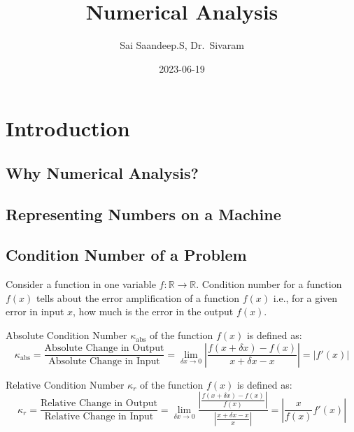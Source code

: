 \documentclass[
]{book}
\title{Numerical Analysis}
\author{Sai Saandeep.S, Dr.~Sivaram}
\date{2023-06-19}
\begin{document}
\maketitle

{
\setcounter{tocdepth}{1}
\tableofcontents
}
\hypertarget{introduction}{%
\chapter{Introduction}\label{introduction}}

\hypertarget{why-numerical-analysis}{%
\section{Why Numerical Analysis?}\label{why-numerical-analysis}}

\hypertarget{representing-numbers-on-a-machine}{%
\section{Representing Numbers on a Machine}\label{representing-numbers-on-a-machine}}

\hypertarget{condition-number-of-a-problem}{%
\section{Condition Number of a Problem}\label{condition-number-of-a-problem}}

Consider a function in one variable \(f:\mathbb{R}\to\mathbb{R}\).
Condition number for a function \(f(x)\) tells about the error amplification of a function \(f(x)\) i.e., for a given error in input \(x\), how much is the error in the output \(f(x)\).

Absolute Condition Number \(\kappa_{\text{abs}}\) of the function \(f(x)\) is defined as:
\begin{equation}
\kappa_{\text{abs}} = \frac{\text{Absolute Change in Output}}{\text{Absolute Change in Input}} = \lim_{\delta x \to 0} \left\lvert{\frac{f(x+\delta x)-f(x)}{x+\delta x - x}}\right\rvert = \left\lvert{f'(x)}\right\rvert
\end{equation}

Relative Condition Number \(\kappa_{r}\) of the function \(f(x)\) is defined as:
\begin{equation}
\kappa_{r} = \frac{\text{Relative Change in Output}}{\text{Relative Change in Input}} = \lim_{\delta x \to 0} \frac{\left\lvert{\frac{f(x+\delta x)-f(x)}{f(x)}}\right\rvert}{\left\lvert{\frac{x+\delta x - x}{x}}\right\rvert} = \left\lvert{\frac{x}{f(x)}f'(x)}\right\rvert
\end{equation}
\end{document}
